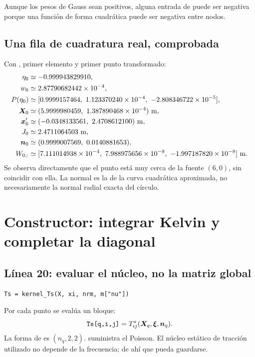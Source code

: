 \documentclass[11pt,a4paper]{article}
\numberwithin{equation}{section}
\newcommand{\vect}[1]{\bm{#1}}
\DeclareRobustCommand{\code}[1]{\texttt{\detokenize{#1}}}
\begin{document}
Aunque los pesos de Gauss sean positivos, alguna entrada de \code{W}
puede ser negativa porque una funci\'on de forma cuadr\'atica
puede ser negativa entre nodos.

\subsection{Una fila de cuadratura real, comprobada}
Con \code{ic=0}, primer elemento y primer punto transformado:
\begin{align}
 \eta_0&\simeq-0.999943829910,\\
 w_0&\simeq2.87790682442\times10^{-4},\\
 P(\eta_0)&\simeq
 [0.9999157464,\ 1.123370240\times10^{-4},\
   -2.808346722\times10^{-5}],\\
 \vect X_0&\simeq
 (5.9999980459,\ 1.387890468\times10^{-4})\ {\rm m},\\
 \vect x'_0&\simeq(-0.0348133561,\ 2.4708612100)\ {\rm m},\\
 J_0&\simeq2.4711064503\ {\rm m},\\
 \vect n_0&\simeq(0.9999007569,\ 0.0140881653),\\
 W_{0,:}&\simeq
 [7.111014938\times10^{-4},\
  7.988975656\times10^{-8},\
 -1.997187820\times10^{-8}]\ {\rm m}.
\end{align}
Se observa directamente que el punto est\'a muy cerca de la fuente
$(6,0)$, sin coincidir con ella.
La normal es la de la curva cuadr\'atica aproximada, no necesariamente
la normal radial exacta del c\'irculo.

\section{Constructor: integrar Kelvin y completar la diagonal}
\label{sec:estatica}
\subsection{L\'inea 20: evaluar el n\'ucleo, no la matriz global}
\begin{lstlisting}
Ts = kernel_Ts(X, xi, nrm, m["nu"])
\end{lstlisting}
Por cada punto \code{X[q]} se eval\'ua un bloque:
\begin{equation}
 \code{Ts[q,i,j]}=T^s_{ij}(\vect X_q,\vect\xi,\vect n_q).
\end{equation}
La forma de \code{Ts} es $(n_q,2,2)$.
\code{m["nu"]} suministra el Poisson.
El n\'ucleo est\'atico de tracci\'on utilizado no depende de la
frecuencia; de ah\'i que pueda guardarse.
\end{document}
